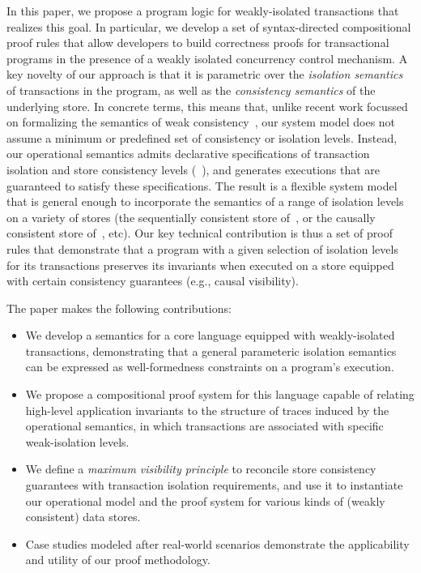 
In this paper, we propose a program logic for weakly-isolated
transactions that realizes this goal.  In particular, we develop a set
of syntax-directed compositional proof rules that allow developers to
build correctness proofs for transactional programs in the presence of
a weakly isolated concurrency control mechanism.  A key novelty of our
approach is that it is parametric over the \emph{isolation semantics}
of transactions in the program, as well as the \emph{consistency
  semantics} of the underlying store. In concrete terms, this means
that, unlike recent work focussed on formalizing the semantics of weak
consistency~\cite{gotsmanpopl16, redblueatc, ecinec}, our system model
does not assume a minimum or predefined set of consistency or
isolation levels. Instead, our operational semantics admits
declarative specifications of transaction isolation and store
consistency levels (\eg~\cite{pldi15,gotsmanconcur15}), and generates
executions that are guaranteed to satisfy these specifications. The
result is a flexible system model that is general enough to
incorporate the semantics of a range of isolation levels on a variety
of stores (\eg the sequentially consistent store of~\cite{adyaphd}, or
the causally consistent store of~\cite{gotsmanpopl16}, etc).  Our key
technical contribution is thus a set of proof rules that demonstrate
that a program with a given selection of isolation levels for its
transactions preserves its invariants when executed on a store
equipped with certain consistency guarantees (e.g., causal
visibility).

The paper makes the following contributions:
\begin{itemize}
  \item We develop a semantics for a core language equipped with
    weakly-isolated transactions, demonstrating that a general
    parameteric isolation semantics can be expressed as
    well-formedness constraints on a program's execution.
  \item We propose a compositional proof system for this language
    capable of relating high-level application invariants to the structure
    of traces induced by the operational semantics, in which transactions
    are associated with specific weak-isolation levels.
  \item We define a \emph{maximum visibility principle} to reconcile
    store consistency guarantees with transaction isolation
    requirements, and use it to instantiate our operational model and
    the proof system for various kinds of (weakly consistent) data
    stores.
  \item Case studies modeled after real-world scenarios demonstrate
    the applicability and utility of our proof methodology.
\end{itemize}

